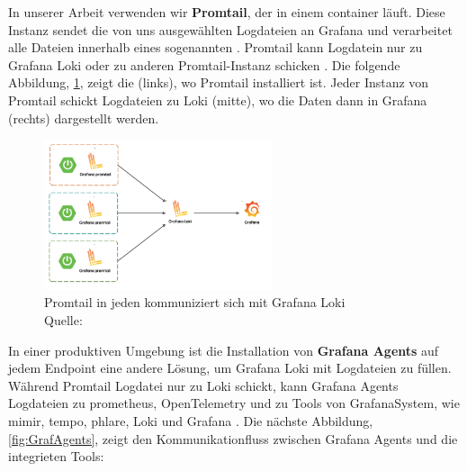 In unserer Arbeit verwenden wir \textbf{Promtail}, der in einem \gls{container} läuft. Diese Instanz sendet die von uns ausgewählten Logdateien an Grafana und verarbeitet alle Dateien innerhalb eines sogenannten . Promtail kann Logdatein nur zu Grafana Loki oder zu anderen Promtail-Instanz schicken \citep{Grafana_Promtail}. Die folgende Abbildung, \ref{fig:Promtail_Diagramm}, zeigt die  (links), wo Promtail installiert ist. Jeder Instanz von Promtail schickt Logdateien zu Loki (mitte), wo die Daten dann in Grafana (rechts) dargestellt werden.


\begin{figure}[H]
   \centering
   \includegraphics[width=0.6\textwidth]{assets/Promtail_Diagramm.png}
   \caption[Promtail in jeden  kommuniziert sich mit Grafana Loki]
   {Promtail in jeden  kommuniziert sich mit Grafana Loki\\Quelle: \citep{SpringCloud_Promtail}}
   \label{fig:Promtail_Diagramm}
   \centering
\end{figure}

In einer produktiven Umgebung ist die Installation von \textbf{Grafana Agents} auf jedem \gls{Endpoint} eine andere Lösung, um Grafana Loki mit Logdateien zu füllen. Während Promtail Logdatei nur zu Loki schickt, kann Grafana Agents Logdateien zu \gls{prometheus}, OpenTelemetry und zu Tools von \gls{GrafanaSystem}, wie \gls{mimir}, \gls{tempo}, \gls{phlare}, Loki und Grafana \citep{Grafana_Agents}. Die nächste Abbildung, \ref{fig:GrafAgents}, zeigt den Kommunikationfluss zwischen Grafana Agents und die integrieten Tools:


